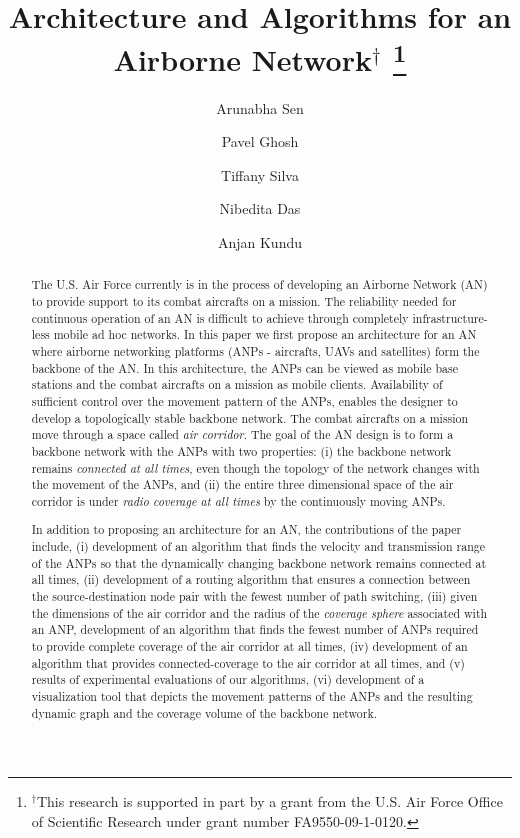 \documentclass[10pt]{IEEEtran}
\title{Architecture and Algorithms for an Airborne Network$^\dagger$
\thanks{$^\dagger$This research is supported in part by a grant from the U.S. Air Force Office of Scientific Research under grant number FA9550-09-1-0120.}}
\author[1]{Arunabha Sen}
\author[1]{Pavel Ghosh}
\author[1]{Tiffany Silva}
\author[1]{Nibedita Das}
\author[2]{Anjan Kundu}
\affil[1]{Department of Computer Science and Engineering, Arizona State University, Tempe, AZ, 85281 \authorcr \{Pavel.Ghosh, asen, tsilva, nmaulik\}@asu.edu}
\affil[2]{Saha Institute of Nuclear Physics, Kolkata 700064, India \authorcr anjan.kundu@saha.ac.in}
\begin{document}
\maketitle
\begin{abstract}
The U.S. Air Force currently is in the process of developing an Airborne Network (AN) to provide support to its combat aircrafts on a mission. The reliability needed for continuous operation of an AN is difficult to achieve through completely infrastructure-less mobile ad hoc networks. In this paper we first propose an architecture for an AN where airborne networking platforms (ANPs - aircrafts, UAVs and satellites) form the backbone of the AN. In this architecture, the ANPs can be viewed as mobile base stations and the combat aircrafts on a mission as mobile clients. Availability of sufficient control over the movement pattern of the ANPs, enables the designer to develop a topologically stable backbone network. The combat aircrafts on a mission move through a space called {\em air corridor}. The goal of the AN design is to form a backbone network with the ANPs with two properties: (i) the backbone network remains {\em connected at all times}, even though the topology of the network changes with the movement of the ANPs, and (ii) the entire three dimensional space of the air corridor is under {\em radio coverage at all times} by the continuously moving ANPs.

In addition to proposing an architecture for an AN,  the contributions of the paper include, (i) development of an algorithm that finds the velocity and transmission range of the ANPs so that the dynamically changing backbone network remains connected at all times, (ii) development of a routing algorithm that ensures a connection between the source-destination  node pair with the fewest number of path switching, (iii) given the dimensions of the air corridor and the radius of the {\em coverage sphere} associated with an ANP, development of an algorithm that finds the fewest number of ANPs required to provide complete coverage of the air corridor at all times, (iv) development of an algorithm that provides connected-coverage to the air corridor at all times, and (v) results of experimental evaluations of our algorithms, (vi) development of a  visualization tool that depicts the movement patterns of the ANPs and the resulting dynamic graph and the coverage volume of the backbone network.
\end{abstract}
\end{document}
